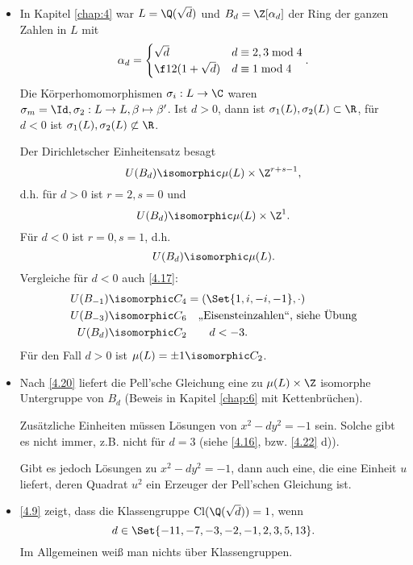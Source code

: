 \begin{nt}
	\begin{itemize}
		\item
			In Kapitel \ref{chap:4} war $L = \Q(\sqrt d)$ und $B_d = \Z[\alpha_d]$ der Ring der ganzen Zahlen in $L$ mit
			\[
				\alpha_d = \begin{cases}
					\sqrt d & d \equiv 2, 3 \bmod 4 \\
					\f 12 (1 + \sqrt d) & d \equiv 1 \bmod 4
				\end{cases}.
			\]
			Die Körperhomomorphismen $\sigma_i: L \to \C$ waren $\sigma_m = \Id, \sigma_2: L \to L, \beta \mapsto \beta'$.
			Ist $d > 0$, dann ist $\sigma_1(L), \sigma_2(L) \subset \R$, für $d < 0$ ist $\sigma_1(L), \sigma_2(L) \not\subset \R$.

			Der Dirichletscher Einheitensatz besagt
			\[
				U(B_d) \isomorphic \mu(L) \times \Z^{r+s-1},
			\]
			d.h. für $d > 0$ ist $r = 2, s = 0$ und
			\[
				U(B_d) \isomorphic \mu(L) \times \Z^1.
			\]
			Für $d < 0$ ist $r = 0, s = 1$, d.h.
			\[
				U(B_d) \isomorphic \mu(L).
			\]
			Vergleiche für $d < 0$ auch \ref{4.17}:
			\begin{align*}
				U(B_{-1}) &\isomorphic C_4 = (\Set{1, i, -i, -1}, \cdot) \\
				U(B_{-3}) &\isomorphic C_6  \quad \text{„Eisensteinzahlen“, siehe Übung} \\
				U(B_d) &\isomorphic C_2 \qquad d < -3.
			\end{align*}
			Für den Fall $d > 0$ ist $\mu(L) = \pm 1 \isomorphic C_2$.

		\item
			Nach \ref{4.20} liefert die Pell'sche Gleichung eine zu $\mu(L) \times \Z$ isomorphe Untergruppe von $B_d$ (Beweis in Kapitel \ref{chap:6} mit Kettenbrüchen).

			Zusätzliche Einheiten müssen Lösungen von $x^2 - dy^2 = -1$ sein.
			Solche gibt es nicht immer, z.B. nicht für $d = 3$ (siehe \ref{4.16}, bzw. \ref{4.22} d)).

			Gibt es jedoch Lösungen zu $x^2 - dy^2 = -1$, dann auch eine, die eine Einheit $u$ liefert, deren Quadrat $u^2$ ein Erzeuger der Pell'schen Gleichung ist.
		\item
			\ref{4.9} zeigt, dass die Klassengruppe $\Cl(\Q(\sqrt d)) = 1$, wenn
			\[
				d \in \Set{-11, -7, -3, -2, -1, 2, 3, 5, 13}.
			\]
			Im Allgemeinen weiß man nichts über Klassengruppen.
	\end{itemize}
\end{nt}

